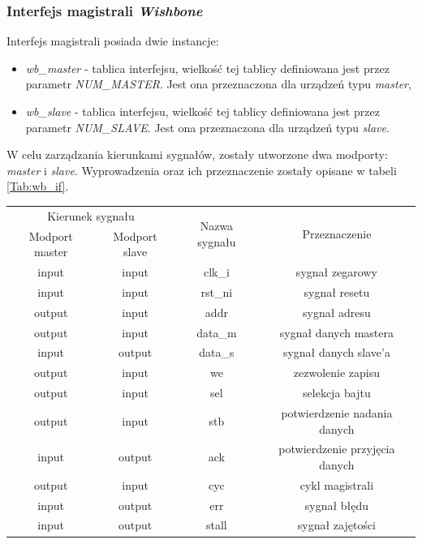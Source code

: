 \documentclass[11pt,a4paper]{article}
\begin{document}
\subsubsection{Interfejs magistrali \textit{Wishbone}}
Interfejs magistrali posiada dwie instancje:
\begin{itemize}
\item \textit{wb\_master} - tablica interfejsu, wielkość tej tablicy definiowana jest przez parametr \textit{NUM\_MASTER}. Jest ona przeznaczona dla urządzeń typu \textit{master},
\item \textit{wb\_slave} - tablica interfejsu, wielkość tej tablicy definiowana jest przez parametr \textit{NUM\_SLAVE}. Jest ona przeznaczona dla urządzeń typu \textit{slave}.
 \end{itemize}
 W celu zarządzania kierunkami sygnałów, zostały utworzone dwa modporty: \textit{master} i \textit{slave}. Wyprowadzenia oraz ich przeznaczenie zostały opisane w tabeli \ref{Tab:wb_if}.
 \\
 \begin{minipage}{\textwidth}
		 \begin{center}
				\begin{tabular}{|c|c|c|c|}
					\hline
					\multicolumn{2}{|c|}{Kierunek sygnału} & \multirow{2}{*}{Nazwa sygnału} & \multirow{2}{*}{Przeznaczenie}\\
					\cline{1-2}
					Modport master & Modport slave & & \\ 
					\hline
					input & input & clk\_i & sygnał zegarowy \\
					\hline
					input & input & rst\_ni & sygnał resetu \\
					\hline
					output & input & addr & sygnał adresu\\
					\hline
					output & input & data\_m & sygnał danych mastera\\
					\hline
					input & output & data\_s & sygnał danych slave'a\\
					\hline
					output & input & we & zezwolenie zapisu\\
					\hline
					output & input & sel & selekcja bajtu\\
					\hline
					output & input & stb & potwierdzenie nadania danych\\
					\hline
					input & output & ack & potwierdzenie przyjęcia danych\\
					\hline
					output & input & cyc & cykl magistrali\\
					\hline
					input & output & err & sygnał błędu\\
					\hline
					input & output & stall & sygnał zajętości\\
					\hline
				\end{tabular}
		\end{center}
		\end{minipage}
\end{document}
